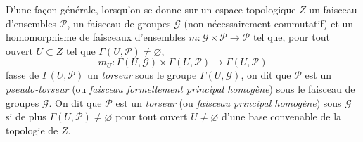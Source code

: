 \begin{env}[16.5.15]
\label{IV.16.5.15}
D'une façon générale, lorsqu'on se donne sur un espace topologique $Z$ un
faisceau d'ensembles $\mathscr{P}$, un faisceau de groupes $\mathscr{G}$ (non
nécessairement commutatif) et un homomorphisme de faisceaux d'ensembles
$m:\mathscr{G}\times\mathscr{P}\to\mathscr{P}$ tel que, pour tout ouvert
$U\subset Z$ tel que $\Gamma(U,\mathscr{P})\neq\varnothing$,
\[
  m_U:\Gamma(U,\mathscr{G})\times\Gamma(U,\mathscr{P})
  \longrightarrow\Gamma(U,\mathscr{P})
\]
fasse de $\Gamma(U,\mathscr{P})$ un \emph{torseur} sous le groupe
$\Gamma(U,\mathscr{G})$, on dit que $\mathscr{P}$ est un
\emph{pseudo-torseur} (ou \emph{faisceau formellement principal homogène})
sous le faisceau de groupes $\mathscr{G}$. On dit que $\mathscr{P}$ est un
\emph{torseur} (ou \emph{faisceau principal homogène}) sous $\mathscr{G}$ si
de plus $\Gamma(U,\mathscr{P})\neq\varnothing$ pour tout ouvert
$U\neq\varnothing$ d'une base convenable de la topologie de $Z$.


\end{env}
